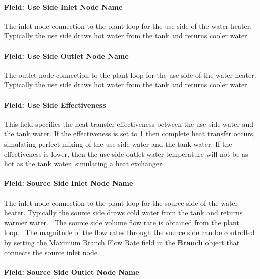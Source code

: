 \paragraph{Field: Use Side Inlet Node Name}\label{field-use-side-inlet-node-name-000}

The inlet node connection to the plant loop for the use side of the water heater. Typically the use side draws hot water from the tank and returns cooler water.

\paragraph{Field: Use Side Outlet Node Name}\label{field-use-side-outlet-node-name-000}

The outlet node connection to the plant loop for the use side of the water heater. Typically the use side draws hot water from the tank and returns cooler water.

\paragraph{Field: Use Side Effectiveness}\label{field-use-side-effectiveness}

This field specifies the heat transfer effectiveness between the use side water and the tank water. If the effectiveness is set to 1 then complete heat transfer occurs, simulating perfect mixing of the use side water and the tank water. If the effectiveness is lower, then the use side outlet water temperature will not be as hot as the tank water, simulating a heat exchanger.

\paragraph{Field: Source Side Inlet Node Name}\label{field-source-side-inlet-node-name-000}

The inlet node connection to the plant loop for the source side of the water heater. Typically the source side draws cold water from the tank and returns warmer water.~ The source side volume flow rate is obtained from the plant loop.~ The magnitude of the flow rates through the source side can be controlled by setting the Maximum Branch Flow Rate field in the \textbf{Branch} object that connects the source inlet node.

\paragraph{Field: Source Side Outlet Node Name}\label{field-source-side-outlet-node-name-000}

